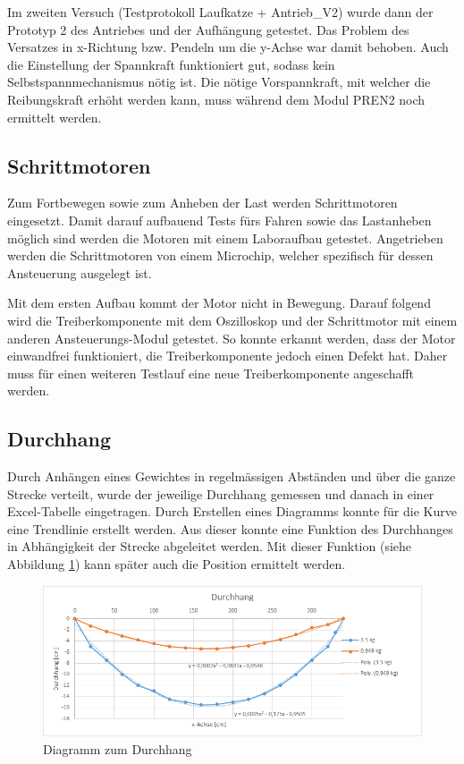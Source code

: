 \documentclass[a4paper]{report}
\begin{document}
Im zweiten Versuch (Testprotokoll Laufkatze + Antrieb\_V2) wurde dann der Prototyp 2 des Antriebes und der Aufhängung getestet. Das Problem des Versatzes in x-Richtung bzw. Pendeln um die y-Achse war damit behoben. Auch die Einstellung der Spannkraft funktioniert gut, sodass kein Selbstspannmechanismus nötig ist. Die nötige Vorspannkraft, mit welcher die Reibungskraft erhöht werden kann, muss während dem Modul PREN2 noch ermittelt werden.

\subsection{Schrittmotoren}
Zum Fortbewegen sowie zum Anheben der Last werden Schrittmotoren eingesetzt. Damit darauf aufbauend Tests fürs Fahren sowie das Lastanheben möglich sind werden die Motoren mit einem Laboraufbau getestet. Angetrieben werden die Schrittmotoren von einem Microchip, welcher spezifisch für dessen Ansteuerung ausgelegt ist.

Mit dem ersten Aufbau kommt der Motor nicht in Bewegung. Darauf folgend wird die Treiberkomponente mit dem Oszilloskop und der Schrittmotor mit einem anderen Ansteuerungs-Modul getestet. So konnte erkannt werden, dass der Motor einwandfrei funktioniert, die Treiberkomponente jedoch einen Defekt hat. Daher muss für einen weiteren Testlauf eine neue Treiberkomponente angeschafft werden.

\subsection{Durchhang}
\label{ssec:VersDurch}
Durch Anhängen eines Gewichtes in regelmässigen Abständen und über die ganze Strecke verteilt, wurde der jeweilige Durchhang gemessen und danach in einer Excel-Tabelle eingetragen. Durch Erstellen eines Diagramms konnte für die Kurve eine Trendlinie erstellt werden. Aus dieser konnte eine Funktion des Durchhanges in Abhängigkeit der Strecke abgeleitet werden. Mit dieser Funktion (siehe Abbildung \ref{fig:Durchhang_v1}) kann später auch die Position ermittelt werden.
\begin{figure}[h!]
	\centering
	\includegraphics[width=\textwidth,keepaspectratio]{Durchhang_v1}
	\caption{Diagramm zum Durchhang}
	\label{fig:Durchhang_v1}
\end{figure}
\end{document}
